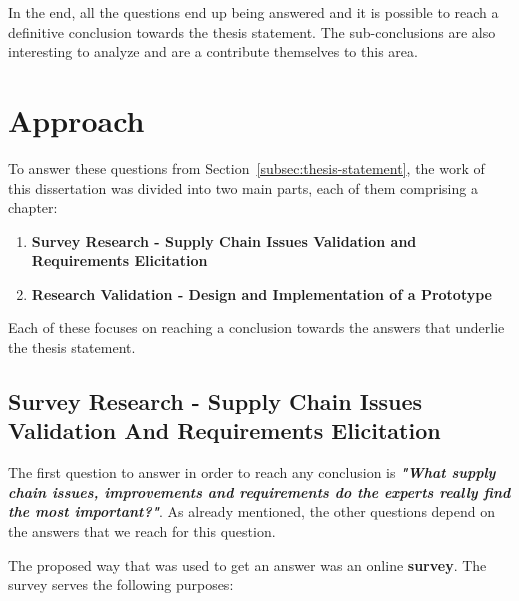 In the end, all the questions end up being answered and it is possible to reach a definitive conclusion towards the thesis statement. The sub-conclusions are also interesting to analyze and are a contribute themselves to this area.

\section{Approach}


To answer these questions from Section~\ref{subsec:thesis-statement}, the work of this dissertation was divided into two main parts, each of them comprising a chapter:
\begin{enumerate}
\item \textbf{Survey Research - Supply Chain Issues Validation and Requirements Elicitation}
\item \textbf{Research Validation - Design and Implementation of a Prototype}
\end{enumerate}

Each of these focuses on reaching a conclusion towards the answers that underlie the thesis statement.

\subsection{Survey Research - Supply Chain Issues Validation And Requirements Elicitation}
\label{sec:survey-approach}
The first question to answer in order to reach any conclusion is \textbf{\textit{"What supply chain issues, improvements and requirements do the experts really find the most important?"}}. As already mentioned, the other questions depend on the answers that we reach for this question.

The proposed way that was used to get an answer was an online \textbf{survey}. The survey serves the following purposes:

